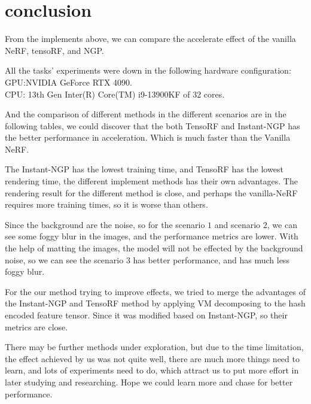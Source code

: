 \section{conclusion}
\label{conclusion}
From the implements above, we can compare the accelerate effect of the vanilla NeRF, tensoRF, and NGP.

All the tasks' experiments were down in the following  hardware configuration:\\
GPU:NVIDIA GeForce RTX 4090.\\
CPU: 13th Gen Inter(R) Core(TM) i9-13900KF of 32 cores.

And the comparison of different methods in the different scenarios are in the following tables, we could discover that the both TensoRF and Instant-NGP has the better performance in acceleration. Which is much faster than the Vanilla NeRF.

The Instant-NGP has the lowest training time, and TensoRF has the lowest rendering time, the different implement methods has their own advantages. The rendering result for the different method is close, and perhaps the vanilla-NeRF requires more training times, so it is worse than others.

Since the background are the noise, so for the scenario $1$ and scenario $2$, we can see some foggy blur in the images, and the performance metrics are lower. With the help of matting the images, the model will not be effected by the background noise, so we can see the scenario $3$ has better performance, and has much less foggy blur.

For the our method trying to improve effects, we tried to merge the advantages of the Instant-NGP and TensoRF method by applying VM decomposing to the hash encoded feature tensor. Since it was modified based on Instant-NGP, so their metrics are close.

There may be further methods under exploration, but due to the time limitation, the effect achieved by us was not quite well, there are much more things need to learn, and lots of experiments need to do, which attract us to put more effort in later studying and researching. Hope we could learn more and chase for better performance. 

